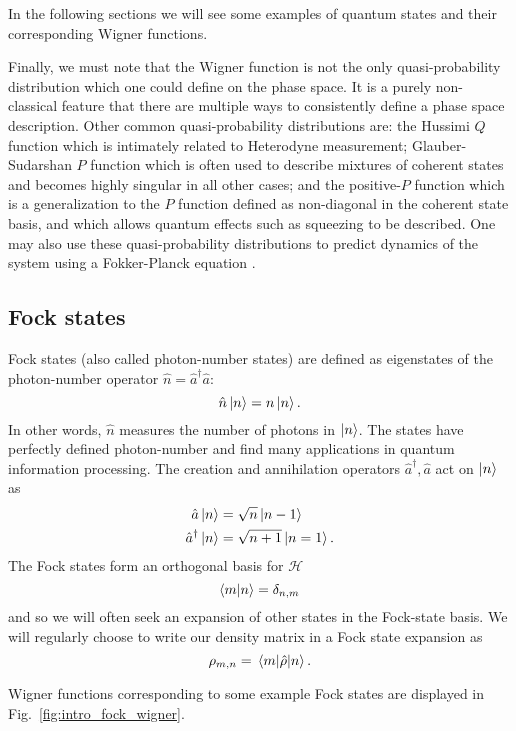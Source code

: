 In the following sections we will see some examples of quantum states and their corresponding Wigner functions. 

Finally, we must note that the Wigner function is not the only quasi-probability distribution which one could define on the phase space. It is a purely non-classical feature that there are multiple ways to consistently define a phase space description. Other common quasi-probability distributions are: the Hussimi $Q$ function  which is intimately related to Heterodyne measurement; Glauber-Sudarshan  $P$ function which is often used to describe mixtures of coherent states and becomes highly singular in all other cases; and the positive-$P$ function which is a generalization to the $P$ function defined as non-diagonal in the coherent state basis, and which allows quantum effects such as squeezing to be described. One may also use these quasi-probability distributions to predict dynamics of the system using a Fokker-Planck equation .

\subsection{Fock states}
Fock states (also called photon-number states) are defined as eigenstates of the photon-number operator $\hat{n} = \hat{a}^\dagger \hat{a}$:
\begin{equation}
\hat{n} \ket{n} = n \ket{n}.
\end{equation}
In other words, $\hat{n}$ measures the number of photons in $\ket{n}$. The states have perfectly defined photon-number and find many applications in quantum information processing. The creation and annihilation operators $\hat{a}^\dagger, \hat{a}$ act on $\ket{n}$ as 
\begin{align*}
\hat{a}\ket{n} &= \sqrt{n}\ket{n-1} \\
\hat{a}^\dagger \ket{n} &= \sqrt{n+1} \ket{n=1}.
\end{align*}
The Fock states form an orthogonal basis for $\mathcal{H}$
\begin{equation}
\ip{m}{n} = \delta_{n, m}
\end{equation}
and so we will often seek an expansion of other states in the Fock-state basis. We will regularly choose to write our density matrix in a Fock state expansion as
\begin{equation}
\rho_{m, n} = \mel{m}{\hat{\rho}}{n}.
\end{equation}

\noindent Wigner functions corresponding to some example Fock states are displayed in Fig.~\ref{fig:intro_fock_wigner}.


